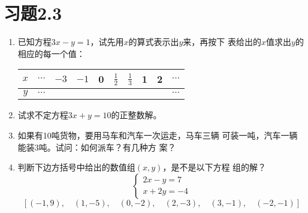 \section*{习题2.3}
\begin{enumerate}
 \item 已知方程$3x-y=1$，试先用$x$的算式表示出$y$来，再按下
表给出的$x$值求出$y$的相应的每一个值：
\begin{center}
    \begin{tabular}{c|ccccccccc}
   $x$ & $\cdots$ &$-3$&$-1$&0&$\frac{1}{2}$&$\frac{1}{3}$&1&2& $\cdots$\\
   \hline
   $y$ & $\cdots$ &&&&&&&&    $\cdots$\\
    \end{tabular}
\end{center}
    \item 试求不定方程$3x+y=10$的正整数解。
    \item 如果有10吨货物，要用马车和汽车一次运走，马车三辆
可装一吨，汽车一辆能装3吨。试问：如何派车？有几种方
案？
\item 判断下边方括号中给出的数值组$(x, y)$，是不是以下方程
组的解？
 \[\begin{cases}
    2x-y=7\\x+2y=-4
 \end{cases}\]   
\[[(-1,9),\quad  (1,-5),\quad  (0,-2),\quad  (2,-3),\quad  (3,-1),\quad  (-2,-1)] \]


\end{enumerate}
